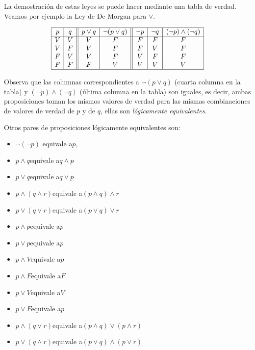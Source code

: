 La demostración de estas leyes se puede hacer mediante una tabla de verdad. 
Veamos por ejemplo la Ley de De Morgan para $\vee$.

$$\begin{array}{|c|c||c|c||c|c|c|}
\hline
 p& q& p\vee q &
\neg (p\vee q)& 
\neg p & 
\neg q & (
\neg p)\wedge(
\neg q)\cr
\hline
V&V&V&F &F&F&F\cr
V&F&V&F&F&V&F\cr
F&V&V&F&V&F&F\cr
F&F&F&V&V&V&V\cr
\hline
\end{array}$$

Observa que las columnas
correspondientes a $
\neg(p \vee q)$ (cuarta columna en la tabla) y 
$(
\neg p) \wedge (
\neg q)$ (\'ultima columna en la tabla) son iguales, es
decir, ambas proposiciones toman los mismos valores de verdad para
las mismas combinaciones de valores de verdad de $p$ y de $q$, ellas
son {\em l\'ogicamente equivalentes}.

\medskip


\begin{prop}
Otros pares de proposiciones l\'ogicamente equivalentes son:
\begin{itemize}
	\item $
\neg(
\neg p)$ \quad \textrm{equivale a}\quad $p$,
	\item $p\wedge q$\quad  \textrm{equivale a}\quad $q\wedge p$
	\item $p\vee q$\quad  \textrm{equivale a}\quad $q\vee p$
	\item $p\wedge (q\wedge r)$\quad  \textrm{equivale a}\quad $(p\wedge q)\wedge r$
	\item $p\vee (q\vee r)$\quad  \textrm{equivale a}\quad $(p\vee q)\vee r$
	\item $p\wedge p$\quad  \textrm{equivale a}\quad $p$
	\item $p\vee p$\quad  \textrm{equivale a}\quad $p$
	\item $p\wedge V$\quad  \textrm{equivale a}\quad $p$
	\item $p\wedge F$\quad  \textrm{equivale a}\quad $F$
	\item $p\vee V$\quad  \textrm{equivale a}\quad $V$
	\item $p\vee F$\quad  \textrm{equivale a}\quad $p$
	\item $p\wedge (q\vee r)$\quad  \textrm{equivale a}\quad $(p\wedge q)\vee (p\wedge r)$
	\item $p\vee (q\wedge r)$\quad  \textrm{equivale a}\quad $(p\vee q)\wedge (p\vee r)$
\end{itemize}
\end{prop}

